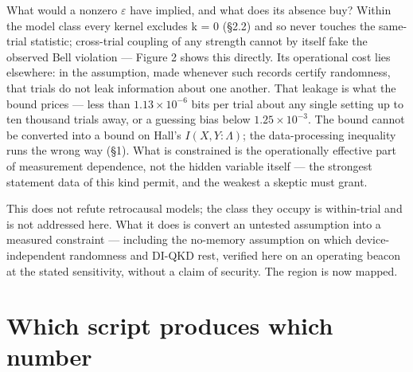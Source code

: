 \documentclass[
  11pt,
]{article}
\begin{document}
What would a nonzero \(\varepsilon\) have implied, and what does its
absence buy? Within the model class every kernel excludes k = 0 (\S2.2)
and so never touches the same-trial statistic; cross-trial coupling of
any strength cannot by itself fake the observed Bell violation ---
Figure 2 shows this directly. Its operational cost lies elsewhere: in
the assumption, made whenever such records certify randomness, that
trials do not leak information about one another. That leakage is what
the bound prices --- less than \(1.13 \times 10^{-6}\) bits per trial
about any single setting up to ten thousand trials away, or a guessing
bias below \(1.25 \times 10^{-3}\). The bound cannot be converted into a
bound on Hall's \(I(X,Y:\Lambda)\); the data-processing inequality runs
the wrong way (\S1). What is constrained is the operationally effective
part of measurement dependence, not the hidden variable itself --- the
strongest statement data of this kind permit, and the weakest a skeptic
must grant.

This does not refute retrocausal models; the class they occupy is
within-trial and is not addressed here. What it does is convert an
untested assumption into a measured constraint --- including the
no-memory assumption on which device-independent randomness and DI-QKD
rest, verified here on an operating beacon at the stated sensitivity,
without a claim of security. The region is now mapped.

\clearpage
\appendix
\section{Which script produces which number}
\end{document}
